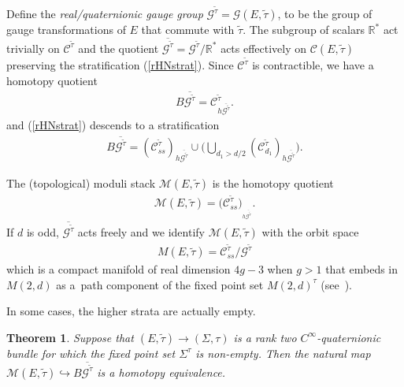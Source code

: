 \documentclass[10pt,a4paper]{amsart}
\numberwithin{equation}{section}
\newtheorem{Theorem}{Theorem}[section]
\begin{document}
Def\/ine the \emph{real/quaternionic gauge group} ${\mathcal G}^{\tilde{\tau}} = {\mathcal G}(E,\tilde{\tau})$, to be the group of gauge transformations of $E$ that commute with $\tilde{\tau}$. The subgroup of scalars ${\mathbb R}^*$ act trivially on ${\mathcal C}^{\tilde{\tau}}$ and the quotient $\overline{{\mathcal G}^{\tilde{\tau}}} = {\mathcal G}^{\tilde{\tau}}/{\mathbb R}^*$ acts ef\/fectively on ${\mathcal C}(E,\tilde{\tau})$ preserving the stratif\/ication (\ref{rHNstrat}). Since ${\mathcal C}^{\tilde{\tau}}$ is contractible, we have a homotopy quotient
\begin{gather*} B\overline{{\mathcal G}^{\tilde{\tau}}} = {\mathcal C}_{h\overline{{\mathcal G}^{\tilde{\tau}}}}^{\tilde{\tau}}.\end{gather*}
and (\ref{rHNstrat}) descends to a stratif\/ication
\begin{gather}\label{rHNstratquot} B\overline{{\mathcal G}^{\tilde{\tau}}} = ({\mathcal C}_{ss}^{\tilde{\tau}})_{h\overline{{\mathcal G}^{\tilde{\tau}}}} \cup \bigg( \bigcup_{d_1 > d/2} ({\mathcal C}_{d_1}^{\tilde{\tau}})_{h\overline{{\mathcal G}^{\tilde{\tau}}}} \bigg). \end{gather}

The (topological) moduli stack ${\mathcal M}(E,\tilde{\tau})$ is the homotopy quotient
\begin{gather*} {\mathcal M}(E,\tilde{\tau}) = \big({\mathcal C}_{ss}^{\tilde{\tau}}\big)_{_{h\overline{{\mathcal G}^{\tilde{\tau}}}}}. \end{gather*} If $d$ is odd, $\overline{{\mathcal G}^{\tilde{\tau}}}$ acts freely and we identify ${\mathcal M}(E,\tilde{\tau})$ with the orbit space \begin{gather*}M(E,\tilde{\tau}) = {\mathcal C}_{ss}^{\tilde{\tau}}/ {\mathcal G}^{\tilde{\tau}}\end{gather*} which is a compact manifold of real dimension $4g-3$ when $g>1$ that embeds in $M(2,d)$ as a~path component of the f\/ixed point set $M(2,d)^{\tau}$ (see~\cite{S12}).

In some cases, the higher strata are actually empty.

\begin{Theorem}\label{QuatDone}
Suppose that $(E,\tilde{\tau}) \rightarrow (\Sigma, \tau)$ is a rank two $C^{\infty}$-quaternionic bundle for which the fixed point set $\Sigma^{\tau}$ is non-empty. Then the natural map $ {\mathcal M}(E,\tilde{\tau}) \hookrightarrow B\overline{{\mathcal G}^{\tilde{\tau}}} $ is a homotopy equivalence.
\end{Theorem}
\end{document}
